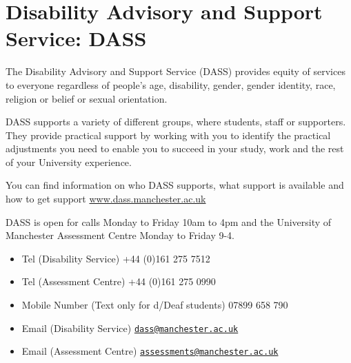 \documentclass[
]{book}
\providecommand{\tightlist}{%
  \setlength{\itemsep}{0pt}\setlength{\parskip}{0pt}}
\begin{document}
\section{Disability Advisory and Support Service: DASS}\label{dass}

The Disability Advisory and Support Service (DASS) provides equity of services to everyone regardless of people's age, disability, gender, gender identity, race, religion or belief or sexual orientation.

DASS supports a variety of different groups, where students, staff or supporters. They provide practical support by working with you to identify the practical adjustments you need to enable you to succeed in your study, work and the rest of your University experience.

You can find information on who DASS supports, what support is available and how to get support \href{https://www.dass.manchester.ac.uk}{www.dass.manchester.ac.uk} \citep{dass}

DASS is open for calls Monday to Friday 10am to 4pm and the University of Manchester Assessment Centre Monday to Friday 9-4.

\begin{itemize}
\tightlist
\item
  Tel (Disability Service) +44 (0)161 275 7512
\item
  Tel (Assessment Centre) +44 (0)161 275 0990
\item
  Mobile Number (Text only for d/Deaf students) 07899 658 790
\item
  Email (Disability Service) \href{mailto:dass@manchester.ac.uk}{\nolinkurl{dass@manchester.ac.uk}}
\item
  Email (Assessment Centre) \href{mailto:assessments@manchester.ac.uk}{\nolinkurl{assessments@manchester.ac.uk}}
\end{itemize}

  
\end{document}
